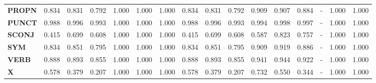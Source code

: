 \begin{table}
\begin{tabular}{|l||l||l||l||l||l||l||l||l||l||l||l||l||l||l||l|}
\textbf{PROPN} & 0.834 & 0.831 & 0.792 & 1.000 & 1.000 & 1.000 & 0.834 & 0.831 & 0.792 & 0.909 & 0.907 & 0.884 & - & 1.000 & 1.000 \\
\textbf{PUNCT} & 0.988 & 0.996 & 0.993 & 1.000 & 1.000 & 1.000 & 0.988 & 0.996 & 0.993 & 0.994 & 0.998 & 0.997 & - & 1.000 & 1.000 \\
\textbf{SCONJ} & 0.415 & 0.699 & 0.608 & 1.000 & 1.000 & 1.000 & 0.415 & 0.699 & 0.608 & 0.587 & 0.823 & 0.757 & - & 1.000 & 1.000 \\
\textbf{SYM} & 0.834 & 0.851 & 0.795 & 1.000 & 1.000 & 1.000 & 0.834 & 0.851 & 0.795 & 0.909 & 0.919 & 0.886 & - & 1.000 & 1.000 \\
\textbf{VERB} & 0.888 & 0.893 & 0.855 & 1.000 & 1.000 & 1.000 & 0.888 & 0.893 & 0.855 & 0.941 & 0.944 & 0.922 & - & 1.000 & 1.000 \\
\textbf{X} & 0.578 & 0.379 & 0.207 & 1.000 & 1.000 & 1.000 & 0.578 & 0.379 & 0.207 & 0.732 & 0.550 & 0.344 & - & 1.000 & 1.000 \\
\bottomrule
\end{tabular}
\end{table}
